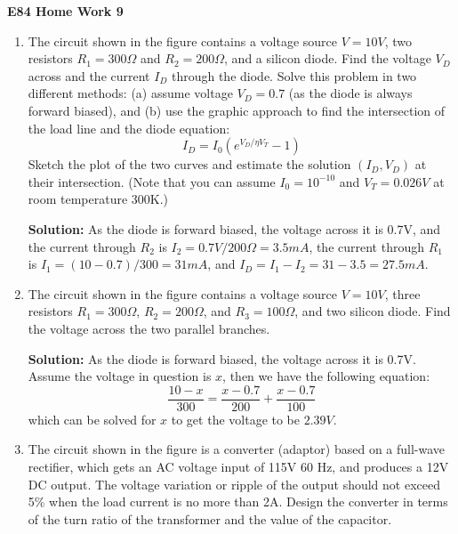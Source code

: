 \usepackage{html}

\begin{center}
{\Large \bf E84 Home Work 9}
\end{center}
\begin{enumerate}

\item The circuit shown in the figure contains a voltage source $V=10V$,
two resistors $R_1=300\Omega$ and $R_2=200\Omega$, and a silicon diode.
Find the voltage $V_D$ across and the current $I_D$ through the diode.
Solve this problem in two different methods: (a) assume voltage $V_D=0.7$ 
(as the diode is always forward biased), and (b) use the graphic approach
to find the intersection of the load line and the diode equation:
\[ I_D=I_0 ( e^{V_D/\eta V_T}-1 ) \]
Sketch the plot of the two curves and estimate the solution $(I_D,V_D)$
at their intersection. (Note that you can assume $I_0=10^{-10}$ and 
$V_T=0.026V$ at room temperature 300K.)


{\bf Solution:} As the diode is forward biased, the voltage across it
is 0.7V, and the current through $R_2$ is $I_2=0.7V/200\Omega=3.5mA$, 
the current through $R_1$ is $I_1=(10-0.7)/300=31 mA$, and 
$I_D=I_1-I_2=31-3.5=27.5 mA$.


\item The circuit shown in the figure contains a voltage source $V=10V$,
three resistors $R_1=300\Omega$, $R_2=200\Omega$, and $R_3=100\Omega$, 
and two silicon diode. Find the voltage across the two parallel branches.


{\bf Solution:} As the diode is forward biased, the voltage across it
is 0.7V. Assume the voltage in question is $x$, then we have the following
equation:
\[	\frac{10-x}{300}=\frac{x-0.7}{200}+\frac{x-0.7}{100}	\]
which can be solved for $x$ to get the voltage to be $2.39V$.

\item The circuit shown in the figure is a converter (adaptor) based on
a full-wave rectifier, which gets an AC voltage input of 115V 60 Hz, and
produces a 12V DC output. The voltage variation or ripple of the output
should not exceed 5\% when the load current is no more than 2A. Design 
the converter in terms of the turn ratio of the transformer and the 
value of the capacitor. 


\end{enumerate}
